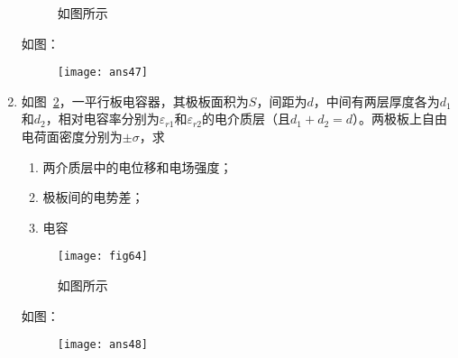 \begin{enumerate}
\begin{figure}[H]
        \caption{如图所示}\label{Fig:63}
    \end{figure}
    \begin{solution}
        如图：
        \begin{figure}[H]
            \centering
            \texttt{[image: ans47]}
        \end{figure}
    \end{solution}
    \item 如图~\ref{Fig:64}，一平行板电容器，其极板面积为$S$，间距为$d$，中间有两层厚度各为$d_1$和$d_2$，相对电容率分别为$\varepsilon_{r1}$和$\varepsilon_{r2}$的电介质层（且$d_1+d_2=d$）。两极板上自由电荷面密度分别为$±\sigma$，求
    \begin{enumerate}[label=(\arabic*)]
        \item 两介质层中的电位移和电场强度；
        \item 极板间的电势差；
        \item 电容
    \end{enumerate}
    \begin{figure}[H]
        \centering
        \texttt{[image: fig64]}
        \caption{如图所示}\label{Fig:64}
    \end{figure}
    \begin{solution}
        如图：
        \begin{figure}[H]
            \centering
            \texttt{[image: ans48]}
        \end{figure}
    \end{solution}
\end{enumerate}
